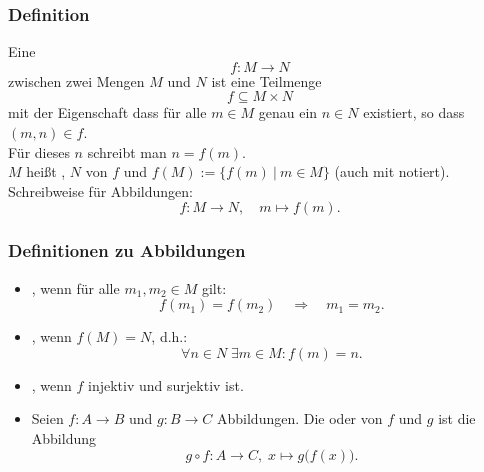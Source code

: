 \begin{frame}\frametitle{Definition}
		Eine  
		$$
			f:M\to N
		$$ 
		zwischen zwei Mengen $M$ und $N$ ist eine Teilmenge 
		$$
			f \subseteq M\times N
		$$ 
		mit der Eigenschaft dass für alle $m\in M$ genau ein $n\in N$ existiert, so dass $(m,n)\in f$.\\
		Für dieses $n$ schreibt man $n = f(m)$.\\[2mm]
		
		\pause
		$M$ hei{\ss}t , $N$  von $f$ und 
		$f(M) := \{ f(m)~|~  m\in M \}$  (auch mit  notiert).\\[2mm]
		
		Schreibweise für Abbildungen:
		\vspace{-2mm}
		$$ 
			f: M\to N, \quad m\mapsto f(m).
		$$

	
\end{frame}
%
%
\begin{frame}\frametitle{Definitionen zu Abbildungen}
		\begin{itemize}
			\item {}, wenn für alle $m_1, m_2 \in M$ gilt:
				$$	f(m_1) = f(m_2)	
					\quad
					\Rightarrow
					\quad
					m_1 = m_2.
				$$ 
			\item {}, wenn $f(M)=N$, d.h.:
				$$
					\forall n\in N\; \exists m\in M: f(m)=n.
				$$
			\item {}, wenn $f$ injektiv und surjektiv ist.\\\vspace{2mm}
			\item 		Seien $f: A\to B$ und $g:B\to C$ Abbildungen. 
		Die  oder  von $f$ und $g$ ist die Abbildung
		$$
			g\circ f: A\to C,\; x\mapsto g\big( f(x) \big).
		$$
		\end{itemize}
\end{frame}
%
%
